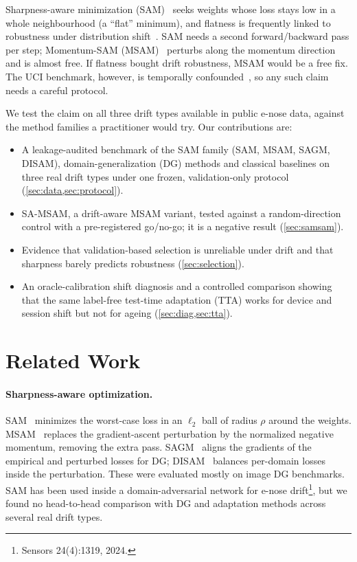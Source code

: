 \documentclass[10pt,twocolumn,letterpaper]{article}
\begin{document}
Sharpness-aware minimization (SAM)~\cite{foret2021sam} seeks weights whose loss stays low in a whole neighbourhood
(a ``flat'' minimum), and flatness is frequently linked to robustness under distribution
shift~\cite{wang2023sagm,zhang2024disam}. SAM needs a second forward/backward pass per step; Momentum-SAM
(MSAM)~\cite{becker2024msam} perturbs along the momentum direction and is almost free. If flatness bought drift
robustness, MSAM would be a free fix. The UCI benchmark, however, is temporally confounded~\cite{dennler2022drift},
so any such claim needs a careful protocol.

We test the claim on all three drift types available in public e-nose data, against the method families a
practitioner would try. Our contributions are:
\begin{itemize}
\item A leakage-audited benchmark of the SAM family (SAM, MSAM, SAGM, DISAM), domain-generalization (DG) methods and
classical baselines on three real drift types under one frozen, validation-only protocol (\cref{sec:data,sec:protocol}).
\item SA-MSAM, a drift-aware MSAM variant, tested against a random-direction control with a pre-registered go/no-go;
it is a negative result (\cref{sec:samsam}).
\item Evidence that validation-based selection is unreliable under drift and that sharpness barely predicts
robustness (\cref{sec:selection}).
\item An oracle-calibration shift diagnosis and a controlled comparison showing that the same label-free test-time
adaptation (TTA) works for device and session shift but not for ageing (\cref{sec:diag,sec:tta}).
\end{itemize}

\section{Related Work}
\label{sec:related}
\paragraph{Sharpness-aware optimization.} SAM~\cite{foret2021sam} minimizes the worst-case loss in an $\ell_2$ ball
of radius $\rho$ around the weights. MSAM~\cite{becker2024msam} replaces the gradient-ascent perturbation by the
normalized negative momentum, removing the extra pass. SAGM~\cite{wang2023sagm} aligns the gradients of the
empirical and perturbed losses for DG; DISAM~\cite{zhang2024disam} balances per-domain losses inside the
perturbation. These were evaluated mostly on image DG benchmarks. SAM has been used inside a domain-adversarial
network for e-nose drift\footnote{Sensors 24(4):1319, 2024.}, but we found no head-to-head comparison with DG and
adaptation methods across several real drift types.
\end{document}

